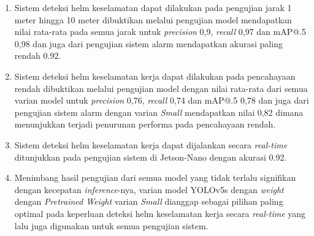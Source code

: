 \begin{enumerate}[nolistsep]
    \item Sistem deteksi helm keselamatan dapat dilakukan pada pengujian jarak 1 meter hingga 10 meter dibuktikan melalui pengujian model mendapatkan nilai rata-rata pada semua jarak untuk \emph{precision} 0,9, \emph{recall} 0,97 dan mAP@.5 0,98  dan juga dari pengujian sistem alarm mendapatkan akurasi paling rendah 0.92.
    \item Sistem deteksi helm keselamatan kerja dapat dilakukan pada pencahayaan rendah dibuktikan melalui pengujian model dengan nilai rata-rata dari semua varian model untuk \emph{precision} 0,76, \emph{recall} 0,74 dan mAP@.5 0,78 dan juga dari pengujian sistem alarm dengan varian \emph{Small} mendapatkan nilai 0,82 dimana menunjukkan terjadi penurunan performa pada pencahayaan rendah.
    \item Sistem deteksi helm keselamatan kerja dapat dijalankan secara \emph{real-time} ditunjukkan pada pengujian sistem di Jetson-Nano dengan akurasi 0.92.

    \item Menimbang hasil pengujian dari semua model yang tidak terlalu signifikan dengan kecepatan \emph{inference}-nya, varian model YOLOv5s dengan \emph{weight} dengan \emph{Pretrained Weight} varian \emph{Small} dianggap sebagai pilihan paling optimal pada keperluan deteksi helm keselamatan kerja secara \emph{real-time} yang lalu juga digunakan untuk semua pengujian sistem.
    
\end{enumerate}

